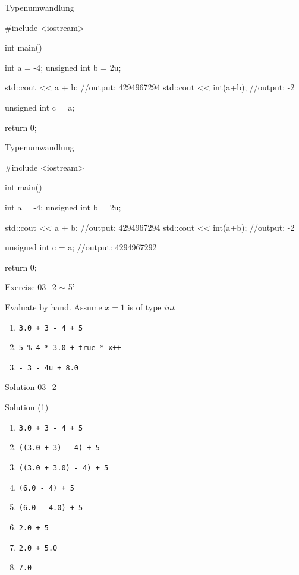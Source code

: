 \ifnum\conditionmacro=1 \documentclass[handout,usenames,dvipsnames]{beamer}\fi
\begin{document}
\begin{frame}[fragile]{Typenumwandlung}
\begin{TFCpp}
#include <iostream>

int main()
{
   int a = -4;
   unsigned int b = 2u;

   std::cout << a + b; //output: 4294967294
   std::cout << int(a+b); //output: -2
   
   unsigned int c = a;

   return 0;
}
\end{TFCpp}
\end{frame}

\begin{frame}[fragile]{Typenumwandlung}
\begin{TFCpp}
#include <iostream>

int main()
{
   int a = -4;
   unsigned int b = 2u;

   std::cout << a + b; //output: 4294967294
   std::cout << int(a+b); //output: -2
   
   unsigned int c = a; //output: 4294967292

   return 0;
}
\end{TFCpp}
\end{frame}

\begin{frame}[fragile]{Exercise 03\_2 $\sim$ 5'}
\begin{block}{Evaluate by hand. Assume $x = 1$ is of type $int$}
\begin{enumerate}
\item \verb,3.0 + 3 - 4 + 5,
\item \verb,5 % 4 * 3.0 + true * x++,
\item \verb,- 3 - 4u + 8.0,
\end{enumerate}
\end{block}
\end{frame}

\begin{frame}[fragile]{Solution 03\_2}
\begin{block}{Solution (1)}
\begin{enumerate}
\item \verb,3.0 + 3 - 4 + 5,
\item<2-> \verb,((3.0 + 3) - 4) + 5,
\item<3-> \verb,((3.0 + 3.0) - 4) + 5,
\item<4-> \verb,(6.0 - 4) + 5,
\item<5-> \verb,(6.0 - 4.0) + 5,
\item<6-> \verb,2.0 + 5,
\item<7-> \verb,2.0 + 5.0,
\item<8-> \verb,7.0,
\end{enumerate}
\end{block}
\end{frame}
\end{document}
